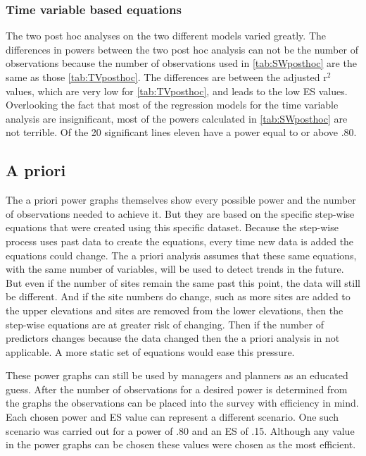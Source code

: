 \begin{itemize}
\subsubsection{Time variable based equations}%
The two post hoc analyses on the two different models varied greatly.
The differences in powers between the two post hoc analysis can not be the number of observations because the number of observations used in \autoref{tab:SWposthoc} are the same as those \autoref{tab:TVposthoc}.
The differences are between the adjusted r$^2$ values, which are very low for \autoref{tab:TVposthoc}, and leads to the low ES values.
Overlooking the fact that most of the regression models for the time variable analysis are insignificant, most of the powers calculated in \autoref{tab:SWposthoc} are not terrible.
Of the 20 significant lines eleven have a power equal to or above .80.

\subsection{A priori}%

The a priori power graphs themselves show every possible power and the number of observations needed to achieve it.
But they are based on the specific step-wise equations that were created using this specific dataset.
Because the step-wise process uses past data to create the equations, every time new data is added the equations could change.
The a priori analysis assumes that these same equations, with the same number of variables, will be used to detect trends in the future.
But even if the number of sites remain the same past this point, the data will still be different.
And if the site numbers do change, such as more sites are added to the upper elevations and sites are removed from the lower elevations, then the step-wise equations are at greater risk of changing.
Then if the number of predictors changes because the data changed then the a priori analysis in not applicable.
A more static set of equations would ease this pressure.

These power graphs can still be used by managers and planners as an educated guess.
After the number of observations for a desired power is determined from the graphs the observations can be placed into the survey with efficiency in mind.
Each chosen power and ES value can represent a different scenario.
One such scenario was carried out for a power of .80 and an ES of .15.
Although any value in the power graphs can be chosen these values were chosen as the most efficient. 


\end{itemize}
